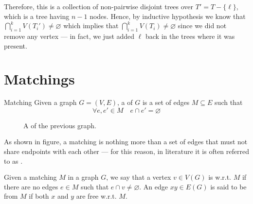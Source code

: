 \documentclass[a4paper, 12pt]{report}
\begin{document}
{        Therefore, this is a collection of non-pairwise disjoint trees over $T' = T - \{\ell\}$, which is a tree having $n - 1$ nodes. Hence, by inductive hypothesis we know that $\bigcap_{i = 1}^k{V(T_i')} \neq \varnothing$ which implies that $\bigcap_{i = 1}^k{V(T_i)}\neq \varnothing$ since we did not remove any vertex --- in fact, we just added $\ell$ back in the trees where it was present.
    }

    \chapter{Matchings}

    \begin{frameddefn}{Matching}
        Given a graph $G = (V, E)$, a  of $G$ is a set of edges $M \subseteq E$ such that $$\forall e, e' \in M \quad e \cap e' = \varnothing$$
    \end{frameddefn}

    \begin{figure}[H]
        \centering
        \caption{A  of the previous graph.}
        \label{matching}
    \end{figure}

    As shown in figure, a matching is nothing more than a set of edges that must not share endpoints with each other — for this reason, in literature it is often referred to as . 

    Given a matching $M$ in a graph $G$, we say that a vertex $v \in V(G)$ is  w.r.t. $M$ if there are no edges $e \in M$ such that $e \cap v \neq \varnothing$. An edge $xy \in E(G)$ is said to be  from $M$ if both $x$ and $y$ are free w.r.t. $M$.
\end{document}
